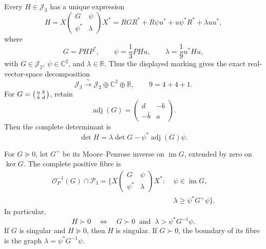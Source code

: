 \begin{theorem}
\label{hlob:thm:block-coordinates}
Every \(H\in\mathcal J_3\) has a unique expression
\begin{equation}
 H=X
 \begin{pmatrix}
  G&\psi\\
  \psi^*&\lambda
 \end{pmatrix}X^*
 =RGR^*+R\psi u^*+u\psi^*R^*+\lambda uu^*,
 \label{hlob:eq:block-expression}
\end{equation}
where
\begin{equation}
 G=PHP^*,\qquad
 \psi=\frac13PHu,\qquad
 \lambda=\frac19u^*Hu,
 \label{hlob:eq:block-inverse}
\end{equation}
with \(G\in\mathcal J_2\), \(\psi\in\mathbb C^2\), and
\(\lambda\in\mathbb R\).  Thus the displayed marking gives the exact
real-vector-space decomposition
\begin{equation}
 \mathcal J_3\xrightarrow{\ \sim\ }
 \mathcal J_2\oplus\mathbb C^2\oplus\mathbb R,
 \qquad 9=4+4+1.
 \label{hlob:eq:four-four-one}
\end{equation}
For
\(G=\begin{psmallmatrix}a&b\\\bar b&d\end{psmallmatrix}\), retain
\begin{equation}
 \operatorname{adj}(G)
 =\begin{pmatrix}d&-b\\-\bar b&a\end{pmatrix}.
 \label{hlob:eq:adjugate}
\end{equation}
Then the complete determinant is
\begin{equation}
 \boxed{\det H
 =\lambda\det G-\psi^*\operatorname{adj}(G)\psi.}
 \label{hlob:eq:cubic-coupling}
\end{equation}

For \(G\succeq0\), let \(G^+\) be its Moore--Penrose inverse on
\(\operatorname{im}G\), extended by zero on \(\ker G\).  The complete
positive fibre is
\begin{equation}
 \begin{split}
 \mathcal O_P^{-1}(G)\cap\mathcal P_3
 =\biggl\{X
 \begin{pmatrix}G&\psi\\\psi^*&\lambda\end{pmatrix}X^*:
 &\ \psi\in\operatorname{im}G,\\[-1mm]
 &\ \lambda\geq\psi^*G^+\psi\biggr\}.
 \end{split}
 \label{hlob:eq:complete-positive-fibre}
\end{equation}
In particular,
\begin{equation}
 H\succ0
 \quad\Longleftrightarrow\quad
 G\succ0\ \text{ and }\ 
 \lambda>\psi^*G^{-1}\psi.
 \label{hlob:eq:positive-definite-condition}
\end{equation}
If \(G\) is singular and \(H\succeq0\), then \(H\) is singular.  If
\(G\succ0\), the boundary of its fibre is the graph
\(\lambda=\psi^*G^{-1}\psi\).
\end{theorem}

